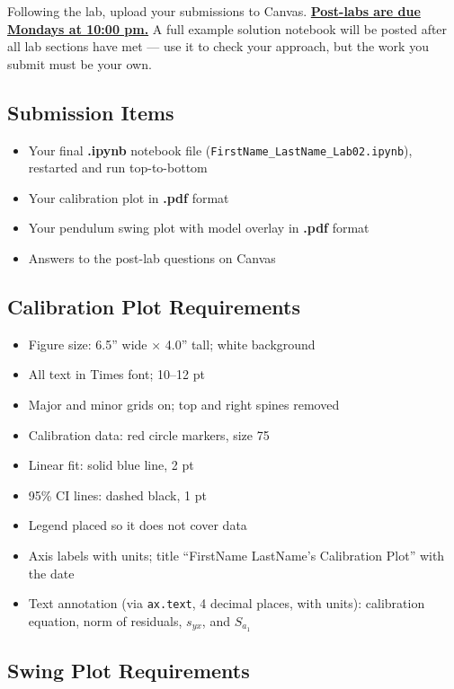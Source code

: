 \documentclass[
  12pt,
  letterpaper,
]{article}
\providecommand{\tightlist}{%
  \setlength{\itemsep}{0pt}\setlength{\parskip}{0pt}}
\begin{document}
Following the lab, upload your submissions to Canvas.
\ul{\textbf{Post-labs are due Mondays at 10:00 pm.}} A full example
solution notebook will be posted after all lab sections have met --- use
it to check your approach, but the work you submit must be your own.

\subsection{Submission Items}\label{submission-items}

\begin{itemize}
\tightlist
\item
  Your final \textbf{.ipynb} notebook file
  (\texttt{FirstName\_LastName\_Lab02.ipynb}), restarted and run
  top-to-bottom
\item
  Your calibration plot in \textbf{.pdf} format
\item
  Your pendulum swing plot with model overlay in \textbf{.pdf} format
\item
  Answers to the post-lab questions on Canvas
\end{itemize}

\subsection{Calibration Plot
Requirements}\label{calibration-plot-requirements}

\begin{itemize}
\tightlist
\item
  Figure size: 6.5'' wide × 4.0'' tall; white background
\item
  All text in Times font; 10--12 pt
\item
  Major and minor grids on; top and right spines removed
\item
  Calibration data: red circle markers, size 75
\item
  Linear fit: solid blue line, 2 pt
\item
  95\% CI lines: dashed black, 1 pt
\item
  Legend placed so it does not cover data
\item
  Axis labels with units; title ``FirstName LastName's Calibration
  Plot'' with the date
\item
  Text annotation (via \texttt{ax.text}, 4 decimal places, with units):
  calibration equation, norm of residuals, \(s_{yx}\), and \(S_{a_1}\)
\end{itemize}

\subsection{Swing Plot Requirements}\label{swing-plot-requirements}
\end{document}
